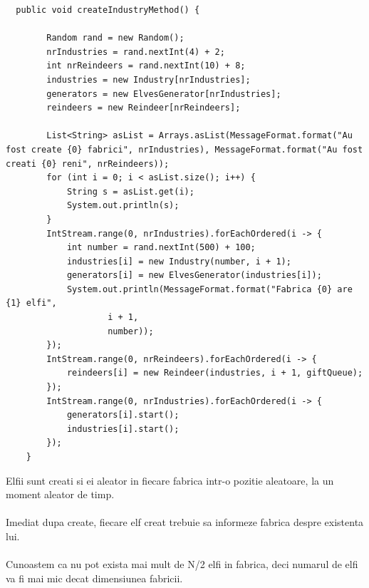 \documentclass{article}
\begin{document}
\begin{lstlisting}
  public void createIndustryMethod() {

        Random rand = new Random();
        nrIndustries = rand.nextInt(4) + 2;
        int nrReindeers = rand.nextInt(10) + 8;
        industries = new Industry[nrIndustries];
        generators = new ElvesGenerator[nrIndustries];
        reindeers = new Reindeer[nrReindeers];

        List<String> asList = Arrays.asList(MessageFormat.format("Au fost create {0} fabrici", nrIndustries), MessageFormat.format("Au fost creati {0} reni", nrReindeers));
        for (int i = 0; i < asList.size(); i++) {
            String s = asList.get(i);
            System.out.println(s);
        }
        IntStream.range(0, nrIndustries).forEachOrdered(i -> {
            int number = rand.nextInt(500) + 100;
            industries[i] = new Industry(number, i + 1);
            generators[i] = new ElvesGenerator(industries[i]);
            System.out.println(MessageFormat.format("Fabrica {0} are {1} elfi",
                    i + 1,
                    number));
        });
        IntStream.range(0, nrReindeers).forEachOrdered(i -> {
            reindeers[i] = new Reindeer(industries, i + 1, giftQueue);
        });
        IntStream.range(0, nrIndustries).forEachOrdered(i -> {
            generators[i].start();
            industries[i].start();
        });
    }
\end{lstlisting}
\vspace{2cm}

Elfii sunt creati si ei aleator in fiecare fabrica intr-o pozitie aleatoare, la un moment aleator de timp.\\\\ Imediat dupa create, fiecare elf creat trebuie sa informeze fabrica despre existenta lui. \\\\ Cunoastem ca nu pot exista mai mult de N/2 elfi in fabrica, deci numarul de elfi va fi mai mic decat dimensiunea fabricii.\\\\
\newline
\end{document}

